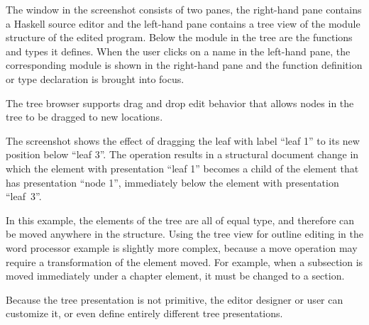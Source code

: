 
The window in the screenshot consists of two panes, the right-hand pane contains a Haskell source editor and the left-hand pane contains a tree view of the module structure of the edited program. Below the module in the tree are the functions and types it defines. When the user clicks on a name in the left-hand pane, the corresponding module is shown in the right-hand pane and the function definition or type declaration is brought into focus. 


The tree browser supports drag and drop edit behavior that allows nodes in the tree to be dragged to new locations. 


The screenshot shows the effect of dragging the leaf with label ``leaf 1'' to its new position below ``leaf 3''. The operation results in a structural document change in which the element with presentation ``leaf 1'' becomes a child of the element that has presentation ``node 1'', immediately below the element with presentation ``leaf~3''.

In this example, the elements of the tree are all of equal type, and therefore can be moved anywhere in the structure. %
Using the tree view for outline editing in the word processor example is slightly more complex, because a move operation may require a transformation of the element moved. For example, when a subsection is moved immediately under a chapter element, it must be changed to a section. 


Because the tree presentation is not primitive, the editor designer or user can customize it, or even define entirely different tree presentations.


